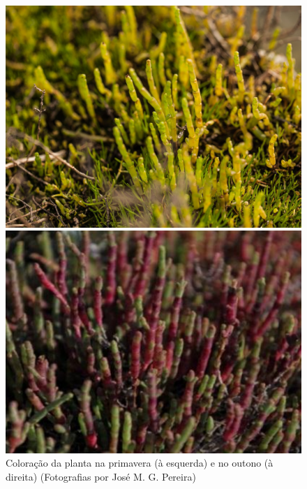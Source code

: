 \begin{figure}[h]
	\centering
	\begin{minipage}[b]{0.49\textwidth}
		\includegraphics[width=\textwidth]{img/cap2-sali/Salicornia04.JPG}
	\end{minipage}
	\hfill
	\begin{minipage}[b]{0.49\textwidth}
		\includegraphics[width=\textwidth]{img/cap2-sali/sal-outono.png}
	\end{minipage}
	\caption[Coloração da planta \sr \space na primavera (à esquerda) e no outono (à direita)]{Coloração da planta \sr \space na primavera (à esquerda) e no outono (à direita) (Fotografias por José M. G. Pereira)}
	\label{primoutono}
\end{figure}


